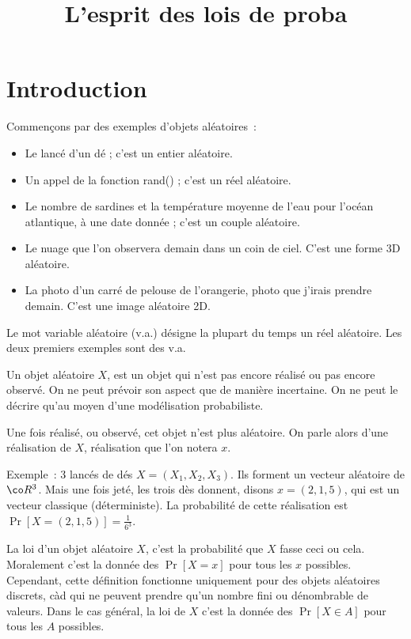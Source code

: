 \documentclass{article}
\title{L'esprit des lois de proba}
\begin{document}
\maketitle



\section{Introduction}



Commençons par des exemples d'objets aléatoires :
\begin{itemize}
\item Le lancé d'un dé ;   c'est un   entier aléatoire.
\item Un appel de la fonction rand() ; c'est un réel aléatoire.  
\item Le nombre de sardines et la température moyenne de l'eau pour l'océan atlantique, à une date donnée ; c'est un couple aléatoire.
\item Le nuage que l'on observera demain dans un coin de ciel. C'est une forme 3D aléatoire. 
\item La photo d'un carré de pelouse de l'orangerie, photo que j'irais prendre demain. C'est une image aléatoire 2D. 
\end{itemize}
Le mot variable aléatoire (v.a.) désigne la plupart du temps un réel aléatoire. Les deux premiers exemples sont des  v.a.



Un objet aléatoire $X$, est un objet qui n'est pas encore réalisé ou pas encore observé. On ne peut prévoir son aspect que de manière incertaine. On ne peut le décrire qu'au moyen d'une modélisation probabiliste.

Une fois réalisé, ou observé, cet objet n'est plus  aléatoire. On parle alors d'une réalisation de $X$, réalisation que l'on notera $x$.  

Exemple : 3 lancés de dés $X=(X_1,X_2,X_3)$. Ils forment un vecteur aléatoire de $\co R^3$. Mais une fois jeté, les trois dès donnent, disons $x=(2,1,5)$,  qui est un vecteur classique (déterministe).  La probabilité de cette réalisation est $\Pr[X=(2,1,5)]=\frac 1 {6^3}$.


La loi d'un objet aléatoire $X$, c'est la probabilité que $X$ fasse ceci ou cela. Moralement c'est la donnée des $\Pr[X=x]$ pour tous les $x$ possibles. Cependant, cette définition fonctionne uniquement  pour des objets aléatoires discrets, càd qui ne peuvent prendre qu'un nombre fini ou dénombrable de valeurs. Dans le cas général, la loi de $X$ c'est la donnée des  $\Pr[X\in A]$ pour tous les $A$ possibles. 
\end{document}
